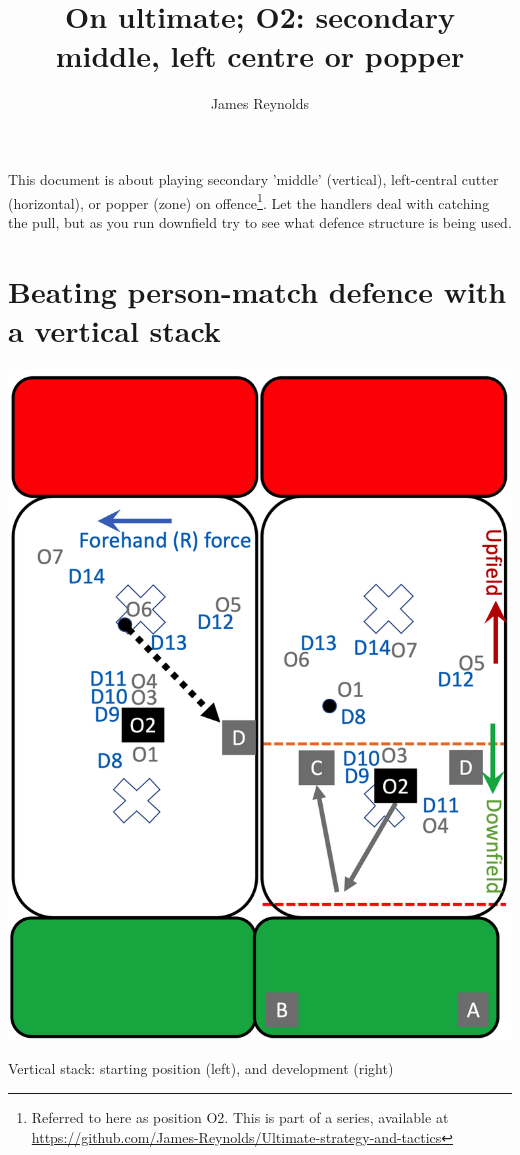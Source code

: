 \documentclass{tufte-handout}
\title{On ultimate; O2: secondary middle, left centre or popper}
\author[James Reynolds]{James Reynolds}
\begin{document}
\maketitle%



This document is about 
playing secondary 'middle'
(vertical), 
left-central cutter 
(horizontal), 
or popper 
(zone) 
on offence\footnote{
Referred to here 
as position O2.
This
is part of a series, 
available at
\url{https://github.com/James-Reynolds/Ultimate-strategy-and-tactics}}.
Let the handlers 
deal with catching the pull, but
as you run downfield
try to 
see
what defence structure
is being used. 

\section{Beating person-match defence with a vertical stack}\label{sec:vertical}

\begin{marginfigure}%
  \includegraphics[width=\linewidth]{O2-vertical}
  \caption{Vertical stack: 
  starting position (left),
  and development (right)}
  \label{fig:O2-vertical}
\end{marginfigure}
\end{document}
